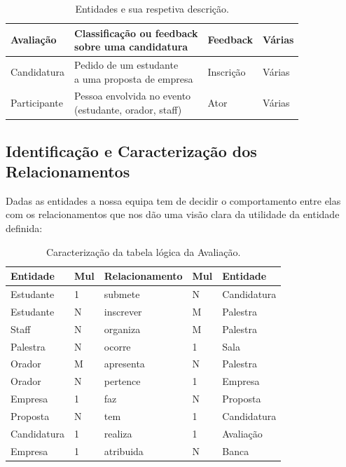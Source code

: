\documentclass[12pt,a4paper]{article}
\renewcommand{\arraystretch}{1.5}  %
\begin{document}
\begin{table}[H]
\begin{tabularx}{\textwidth}{|l|X|l|l|}
        \hline
        Avaliação & \makecell[l]{Classificação ou feedback\\sobre uma candidatura} & Feedback & Várias \\
        \hline
        Candidatura & \makecell[l]{Pedido de um estudante\\a uma proposta de empresa} & Inscrição & Várias \\
        \hline
        Participante & \makecell[l]{Pessoa envolvida no evento\\(estudante, orador, staff)} & Ator & Várias \\
        \hline
    \end{tabularx}
    \caption{Entidades e sua respetiva descrição.}

\end{table}

\subsection{Identificação e Caracterização dos Relacionamentos}

Dadas as entidades a nossa equipa tem de decidir o comportamento entre elas com os relacionamentos
que nos dão uma visão clara da utilidade da entidade definida:

\begin{table}[H]

\centering
\renewcommand{\arraystretch}{1.2}
\begin{tabularx}{\textwidth}{|X|l|X|l|X|}
\hline
\textbf{Entidade} & \textbf{Mul} & \textbf{Relacionamento}  & \textbf{Mul}  & \textbf{Entidade} \\ \hline

Estudante & 1 & submete & N & Candidatura \\ \hline
Estudante & N & inscrever & M & Palestra \\ \hline
Staff & N & organiza & M & Palestra \\ \hline
Palestra & N & ocorre & 1 & Sala \\ \hline
Orador & M & apresenta & N  & Palestra \\ \hline
Orador & N & pertence & 1 & Empresa \\ \hline
Empresa & 1 & faz & N  & Proposta \\ \hline
Proposta & N & tem & 1  & Candidatura \\ \hline
Candidatura & 1 & realiza & 1  & Avaliação \\ \hline
Empresa & 1 & atribuida & N  & Banca \\ \hline

\end{tabularx}
\caption{Caracterização da tabela lógica da Avaliação.}
\end{table}
\end{document}
